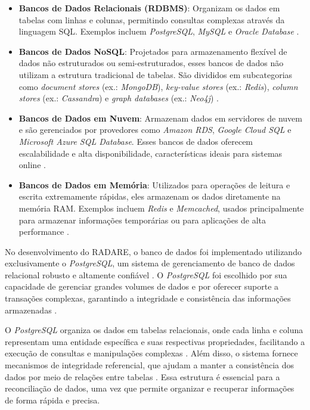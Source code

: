 \begin{itemize}
    \item \textbf{Bancos de Dados Relacionais (RDBMS)}: Organizam os dados em tabelas com linhas e colunas, permitindo consultas complexas através da linguagem SQL. Exemplos incluem \textit{PostgreSQL}, \textit{MySQL} e \textit{Oracle Database} \cite{relationaldatabases}.
    
    \item \textbf{Bancos de Dados NoSQL}: Projetados para armazenamento flexível de dados não estruturados ou semi-estruturados, esses bancos de dados não utilizam a estrutura tradicional de tabelas. São divididos em subcategorias como \textit{document stores} (ex.: \textit{MongoDB}), \textit{key-value stores} (ex.: \textit{Redis}), \textit{column stores} (ex.: \textit{Cassandra}) e \textit{graph databases} (ex.: \textit{Neo4j}) \cite{nosqldatabases}.
    
    \item \textbf{Bancos de Dados em Nuvem}: Armazenam dados em servidores de nuvem e são gerenciados por provedores como \textit{Amazon RDS}, \textit{Google Cloud SQL} e \textit{Microsoft Azure SQL Database}. Esses bancos de dados oferecem escalabilidade e alta disponibilidade, características ideais para sistemas online \cite{clouddatabases}.
    
    \item \textbf{Bancos de Dados em Memória}: Utilizados para operações de leitura e escrita extremamente rápidas, eles armazenam os dados diretamente na memória RAM. Exemplos incluem \textit{Redis} e \textit{Memcached}, usados principalmente para armazenar informações temporárias ou para aplicações de alta performance \cite{inmemorydatabases}.
\end{itemize}

No desenvolvimento do RADARE, o banco de dados foi implementado utilizando exclusivamente o \textit{PostgreSQL}, um sistema de gerenciamento de banco de dados relacional robusto e altamente confiável \cite{postgresql2024}. O \textit{PostgreSQL} foi escolhido por sua capacidade de gerenciar grandes volumes de dados e por oferecer suporte a transações complexas, garantindo a integridade e consistência das informações armazenadas \cite{acidtransactions}.

O \textit{PostgreSQL} organiza os dados em tabelas relacionais, onde cada linha e coluna representam uma entidade específica e suas respectivas propriedades, facilitando a execução de consultas e manipulações complexas \cite{relationaldatabases}. Além disso, o sistema fornece mecanismos de integridade referencial, que ajudam a manter a consistência dos dados por meio de relações entre tabelas \cite{databaseintegrity}. Essa estrutura é essencial para a reconciliação de dados, uma vez que permite organizar e recuperar informações de forma rápida e precisa.

